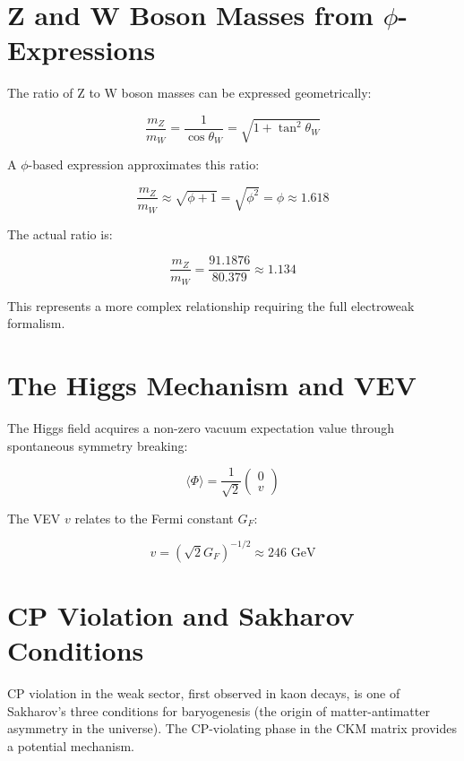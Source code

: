 \section{Z and W Boson Masses from $\phi$-Expressions}

The ratio of Z to W boson masses can be expressed geometrically:

\begin{equation}
\frac{m_Z}{m_W} = \frac{1}{\cos\theta_W} = \sqrt{1 + \tan^2\theta_W}
\end{equation}

A $\phi$-based expression approximates this ratio:

\begin{equation}
\frac{m_Z}{m_W} \approx \sqrt{\phi + 1} = \sqrt{\phi^2} = \phi \approx 1.618
\end{equation}

The actual ratio is:

\begin{equation}
\frac{m_Z}{m_W} = \frac{91.1876}{80.379} \approx 1.134
\end{equation}

This represents a more complex relationship requiring the full electroweak formalism.

\section{The Higgs Mechanism and VEV}

The Higgs field acquires a non-zero vacuum expectation value through spontaneous symmetry breaking:

\begin{equation}
\langle \Phi \rangle = \frac{1}{\sqrt{2}} \begin{pmatrix} 0 \\ v \end{pmatrix}
\end{equation}

The VEV $v$ relates to the Fermi constant $G_F$:

\begin{equation}
v = \left(\sqrt{2} G_F\right)^{-1/2} \approx 246 \text{ GeV}
\end{equation}

\section{CP Violation and Sakharov Conditions}

CP violation in the weak sector, first observed in kaon decays, is one of Sakharov's three conditions for baryogenesis (the origin of matter-antimatter asymmetry in the universe). The CP-violating phase in the CKM matrix provides a potential mechanism.

